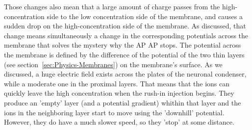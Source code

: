 Those changes also mean that a large amount of charge
passes from the high-concentration side
to the low concentration side of the membrane, and causes a sudden drop
on the high-concentration side of the membrane. As discussed,
that change means simultaneously a change in the corresponding 
potentials across the membrane that solves the mystery why the
\gls{AP}
AP stops. The potential across the membrane is defined by the difference of the
potential of the two thin layers (see section~\ref{sec:Physics-Membranes}) on the membrane's surface.
As we discussed, a huge electric field exists across the
plates of the neuronal condenser, while a moderate one 
in the proximal layers. That means that the ions can quickly
leave the high concentration when the rush-in injection begins.
They produce an 'empty' layer (and a potential gradient)
whithin that layer and the ions in the neighboring layer
start to move using the 'downhill' potential. However, they do have a much slower speed, so they 'stop' at some distance. 
\fi



